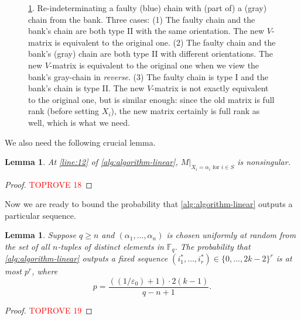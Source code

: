 \documentclass[11pt]{article}
\theoremstyle{plain}
\newtheorem{lemma}[thm]{Lemma}
\theoremstyle{definition}
\theoremstyle{remark}
\newcommand{\F}{\mathbb{F}}
\newcommand{\eps}{\varepsilon}
\begin{document}
\begin{figure}

    \caption{\cref{lem:nonsingular}. Re-indeterminating a faulty (blue) chain with (part of) a (gray) chain from the bank. Three cases: 
    (1) The faulty chain and the bank's chain are both type II with the same orientation.  The new $V$-matrix is equivalent to the original one. 
    (2) The faulty chain and the bank's (gray) chain are both type II with different orientations. The new $V$-matrix is equivalent to the original one when we view the bank's gray-chain in \emph{reverse}.
    (3) The faulty chain is type I and the bank's chain is type II. The new $V$-matrix is not exactly equivalent to the original one, but is similar enough: since the old matrix is full rank (before setting $X_i$), the new matrix certainly is full rank as well, which is what we need.
    }
    \label{fig:replace}
\end{figure}

We also need the following crucial lemma.

\begin{lemma}\label{lem:nonsingular}
At \cref{line:12} of \cref{alg:algorithm-linear}, $M|_{X_i=\alpha_i \text{ for } i\in S}$ is nonsingular.
\end{lemma}

\begin{proof}\textcolor{red}{TOPROVE 18}\end{proof}

Now we are ready to bound the probability that \cref{alg:algorithm-linear} outputs a particular sequence.

\begin{lemma}\label{lastlem}
Suppose $q\geq n$ and $(\alpha_1,\dots,\alpha_n)$ is chosen uniformly at random from the set of all $n$-tuples of distinct elements in $\F_q$. 
The probability that \cref{alg:algorithm-linear} outputs a fixed sequence $(i_1^*,\dots,i_r^*)\in \{0,\dots,2k-2\}^r$ is at most $p^r$, where
\[
p=\frac{((1/\eps_0)+1)\cdot 2(k-1)}{q-n+1}.
\]
\end{lemma}

\begin{proof}\textcolor{red}{TOPROVE 19}\end{proof}
\end{document}

